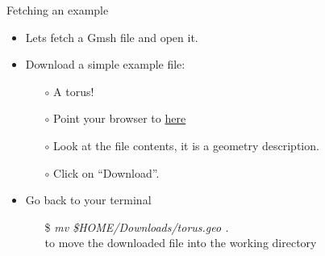 \documentclass[t]{beamer}
\begin{document}
\begin{frame}{Fetching an example}
\begin{itemize}
   \item Lets fetch a Gmsh file and open it.
   \item Download a simple example file:
   \begin{itemize}
      \item[$\circ$] A torus!
      \item[$\circ$] Point your browser to \href{http://figshare.com/s/42c5b418641811e4a3e306ec4bbcf141}{here}
      \item[$\circ$] Look at the file contents, it is a geometry description.
      \item[$\circ$] Click on ``Download''.
   \end{itemize}\vspace{10pt}
   \item Go back to your terminal
   \begin{itemize}
      \item[\$] \emph{mv \$HOME/Downloads/torus.geo .} \\to move the downloaded file into the working directory
   \end{itemize}
\end{itemize}
\end{frame}
\end{document}
